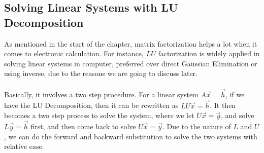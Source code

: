 \subsection{Solving Linear Systems with LU Decomposition}
As mentioned in the start of the chapter, matrix factorization helps a lot when it comes to electronic calculation. For instance, $LU$ factorization is widely applied in solving linear systems in computer, preferred over direct Gaussian Elimination or using inverse, due to the reasons we are going to discuss later.\\
\\
Basically, it involves a two step procedure. For a linear system $A\vec{x} = \vec{h}$, if we have the LU Decomposition, then it can be rewritten as $LU\vec{x} = \vec{h}$. It then becomes a two step process to solve the system, where we let $U\vec{x} = \vec{y}$, and solve $L\vec{y} = \vec{h}$ first, and then come back to solve $U\vec{x} = \vec{y}$. Due to the nature of $L$ and $U$, we can do the forward and backward substitution to solve the two systems with relative ease.


